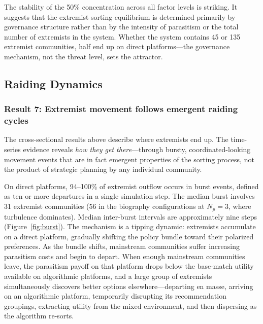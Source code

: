 The stability of the 50\% concentration across all factor levels is striking. It suggests that the extremist sorting equilibrium is determined primarily by governance structure rather than by the intensity of parasitism or the total number of extremists in the system. Whether the system contains 45 or 135 extremist communities, half end up on direct platforms---the governance mechanism, not the threat level, sets the attractor.

\subsection{Raiding Dynamics}
\label{sec:results_raiding}

\subsubsection{Result 7: Extremist movement follows emergent raiding cycles}

The cross-sectional results above describe where extremists end up. The time-series evidence reveals \textit{how they get there}---through bursty, coordinated-looking movement events that are in fact emergent properties of the sorting process, not the product of strategic planning by any individual community.

On direct platforms, 94--100\% of extremist outflow occurs in burst events, defined as ten or more departures in a single simulation step. The median burst involves 31 extremist communities (56 in the biography configurations at $N_p = 3$, where turbulence dominates). Median inter-burst intervals are approximately nine steps (Figure~\ref{fig:burst}). The mechanism is a tipping dynamic: extremists accumulate on a direct platform, gradually shifting the policy bundle toward their polarized preferences. As the bundle shifts, mainstream communities suffer increasing parasitism costs and begin to depart. When enough mainstream communities leave, the parasitism payoff on that platform drops below the base-match utility available on algorithmic platforms, and a large group of extremists simultaneously discovers better options elsewhere---departing en masse, arriving on an algorithmic platform, temporarily disrupting its recommendation groupings, extracting utility from the mixed environment, and then dispersing as the algorithm re-sorts.


